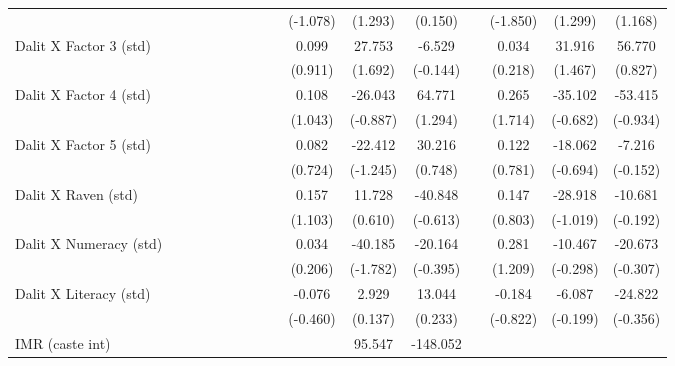 {\begin{longtable}{@{\extracolsep{\fill}}lccccccccccccccc}
          &       &       &       &       &       &       &       &       & (-1.078) & (1.293) & (0.150) &       & (-1.850) & (1.299) & (1.168) \\
    Dalit X Factor 3 (std) &       &       &       &       &       &       &       &       & 0.099 & 27.753 & -6.529 &       & 0.034 & 31.916 & 56.770 \\
          &       &       &       &       &       &       &       &       & (0.911) & (1.692) & (-0.144) &       & (0.218) & (1.467) & (0.827) \\
    Dalit X Factor 4 (std) &       &       &       &       &       &       &       &       & 0.108 & -26.043 & 64.771 &       & 0.265 & -35.102 & -53.415 \\
          &       &       &       &       &       &       &       &       & (1.043) & (-0.887) & (1.294) &       & (1.714) & (-0.682) & (-0.934) \\
    Dalit X Factor 5 (std) &       &       &       &       &       &       &       &       & 0.082 & -22.412 & 30.216 &       & 0.122 & -18.062 & -7.216 \\
          &       &       &       &       &       &       &       &       & (0.724) & (-1.245) & (0.748) &       & (0.781) & (-0.694) & (-0.152) \\
    Dalit X Raven (std) &       &       &       &       &       &       &       &       & 0.157 & 11.728 & -40.848 &       & 0.147 & -28.918 & -10.681 \\
          &       &       &       &       &       &       &       &       & (1.103) & (0.610) & (-0.613) &       & (0.803) & (-1.019) & (-0.192) \\
    Dalit X Numeracy (std) &       &       &       &       &       &       &       &       & 0.034 & -40.185 & -20.164 &       & 0.281 & -10.467 & -20.673 \\
          &       &       &       &       &       &       &       &       & (0.206) & (-1.782) & (-0.395) &       & (1.209) & (-0.298) & (-0.307) \\
    Dalit X Literacy (std) &       &       &       &       &       &       &       &       & -0.076 & 2.929 & 13.044 &       & -0.184 & -6.087 & -24.822 \\
          &       &       &       &       &       &       &       &       & (-0.460) & (0.137) & (0.233) &       & (-0.822) & (-0.199) & (-0.356) \\
    IMR (caste int) &       &       &       &       &       &       &       &       &       & 95.547 & -148.052 &       &       &       &  \\

\end{longtable}}
